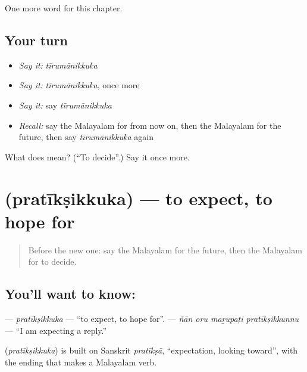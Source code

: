 \begin{grammarlens}[title={What you've built}]
One more word for this chapter.
\end{grammarlens}

\subsection*{Your turn}
\begin{itemize}
\raggedright
  \item \emph{Say it:} \emph{tīrumānikkuka}
  \item \emph{Say it:} \emph{tīrumānikkuka}, once more
  \item \emph{Say it:} say \emph{tīrumānikkuka}
  \item \emph{Recall:} say the Malayalam for from now on, then the Malayalam for the future, then say \emph{tīrumānikkuka} again
\end{itemize}

\begin{tcolorbox}[breakable,colback=teal!4,colframe=teal!35!black,title={Before you move on}]
What does  mean? (\textquotedblleft{}To decide\textquotedblright{}.) Say it once more.
\end{tcolorbox}
\section[\texorpdfstring{\ml{പ്രതീക്ഷിക്കുക} (pratīkṣikkuka)}{പ്രതീക്ഷിക്കുക (pratīkṣikkuka)}]{ (pratīkṣikkuka) — to expect, to hope for}

\label{lesson:ML-C179-pratikshikkuka}



\begin{quote}
Before the new one: say the Malayalam for the future, then the Malayalam for to decide.
\end{quote}

\subsection*{You'll want to know: }
\textbf{} — \emph{pratīkṣikkuka} — \textquotedblleft{}to expect, to hope for\textquotedblright{}. \textbf{   } — \emph{ñān oru maṟupaṭi pratīkṣikkunnu} — \textquotedblleft{}I am expecting a reply.\textquotedblright{}

\begin{cousinweb}
\textbf{} (\emph{pratīkṣikkuka}) is built on Sanskrit \emph{pratīkṣā}, \textquotedblleft{}expectation, looking toward\textquotedblright{}, with the ending that makes a Malayalam verb.
\end{cousinweb}

